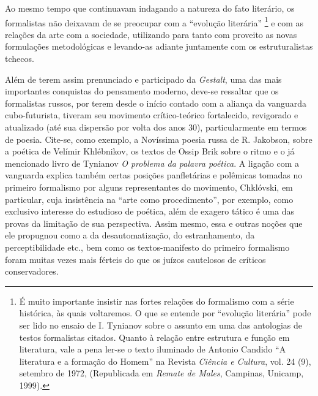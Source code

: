 Ao mesmo tempo que continuavam indagando a natureza do fato literário,
os formalistas não deixavam de se preocupar com a ``evolução literária''
\footnote{É muito importante insistir nas fortes relações do formalismo
  com a série histórica, às quais voltaremos. O que se entende por
  ``evolução literária'' pode ser lido no ensaio de I. Tynianov sobre o
  assunto em uma das antologias de testos formalistas citados. Quanto à
  relação entre estrutura e função em literatura, vale a pena ler-se o
  texto iluminado de Antonio Candido ``A literatura e a formação do
  Homem'' na Revista \emph{Ciência e Cultura}, vol. 24 (9), setembro de
  1972, (Republicada em \emph{Remate de Males}, Campinas, Unicamp,
  1999).} e com as relações da arte com a sociedade, utilizando para
tanto com proveito as novas formulações metodológicas e levando-as
adiante juntamente com os estruturalistas tchecos.

Além de terem assim prenunciado e participado da \emph{Gestalt}, uma das
mais importantes conquistas do pensamento moderno, deve-se ressaltar que
os formalistas russos, por terem desde o início contado com a aliança da
vanguarda cubo-futurista, tiveram seu movimento crítico-teórico
fortalecido, revigorado e atualizado (até sua dispersão por volta dos
anos 30), particularmente em termos de poesia. Cite-se, como exemplo, a
Novíssima poesia russa de R. Jakobson, sobre a poética de Velímir
Khlébnikov, os textos de Ossip Brik sobre o ritmo e o já mencionado
livro de Tynianov \emph{O problema da palavra poética}. A ligação com a
vanguarda explica também certas posições panfletárias e polêmicas
tomadas no primeiro formalismo por alguns representantes do movimento,
Chklóvski, em particular, cuja insistência na ``arte como
procedimento'', por exemplo, como exclusivo interesse do estudioso de
poética, além de exagero tático é uma das provas da limitação de sua
perspectiva. Assim mesmo, essa e outras noções que ele propugnou como a
da desautomatização, do estranhamento, da perceptibilidade etc., bem
como os textos-manifesto do primeiro formalismo foram muitas vezes mais
férteis do que os juízos cautelosos de críticos conservadores.

